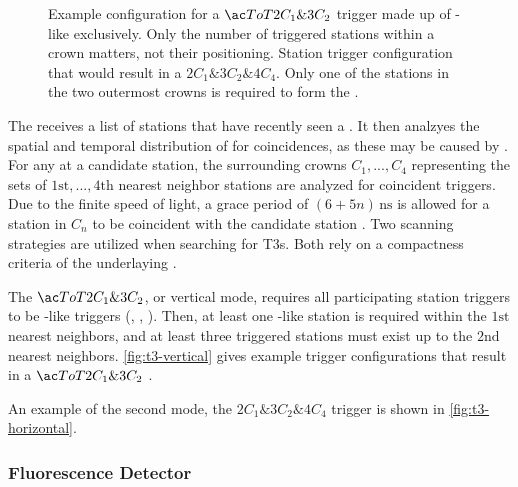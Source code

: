 \begin{figure}[t]
  \centering
  \hspace{0.2cm}
  \caption[]{ Example configuration for a 
  $\ToT2C_1\&3C_2$ \TTHREE trigger made up of \ToT-like \TTWOs exclusively. 
  Only the number of triggered stations within a crown matters, not their 
  positioning.  Station trigger configuration that 
  would result in a $2C_1\&3C_2\&4C_4$. Only one of the stations in the two 
  outermost crowns is required to form the \TTHREE.}
  \label{fig:}
\end{figure}

The \CDAS receives a list of stations that have recently seen a \TTWO. It then
analzyes the spatial and temporal distribution of \TTWOs for coincidences, as 
these may be caused by \EASs. For any \TTWO at a candidate station, the 
surrounding crowns $C_1, ..., C_4$ representing the sets of  
$1\mathrm{st}, ..., 4\mathrm{th}$ nearest neighbor stations are analyzed for 
coincident \TTWO triggers. Due to the finite speed of light, a grace period of 
$(6 + 5n)\,\mathrm{ns}$ is allowed for a station in $C_n$ to be coincident with
the candidate station \cite{abrahamTriggerApertureSurface2010}. Two scanning 
strategies are utilized when searching for \acfp{T3}. Both rely on a 
compactness criteria of the underlaying \TTWOs.

The $\ToT2C_1\&3C_2$, or vertical mode, requires all participating station 
triggers to be \ToT-like triggers (\ToT, \ToTd, \MoPS). Then, at least one 
\ToT-like station is required within the $1\mathrm{st}$ nearest neighbors, and
at least three triggered stations must exist up to the $2\mathrm{nd}$ nearest
neighbors. \cref{fig:t3-vertical} gives example trigger configurations that 
result in a $\ToT2C_1\&3C_2$ \TTHREE.

An example of the second mode, the $2C_1\&3C_2\&4C_4$ \TTHREE trigger is shown
in \cref{fig:t3-horizontal}. 

\subsubsection{Fluorescence Detector}


